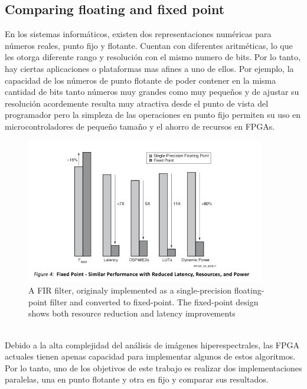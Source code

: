 \subsection{Comparing floating and fixed point}
\label{makereference}

En los sistemas informáticos, existen dos representaciones numéricas para números reales, punto fijo y flotante. Cuentan con diferentes aritméticas, lo que les otorga diferente rango y resolución con el mismo numero de bits. Por lo tanto, hay ciertas aplicaciones o plataformas mas afines a uno de ellos. Por ejemplo, la capacidad de los números de punto flotante de poder contener en la misma cantidad de bits tanto números muy grandes como muy pequeños y de ajustar su resolución acordemente resulta muy atractiva desde el punto de vista del programador pero la simpleza de las operaciones en punto fijo permiten su uso en microcontroladores de pequeño tamaño y el ahorro de recursos en FPGAs.%
\begin{figure}[h!]
\centering
\includegraphics[height=2.5in]{figures/fp_vs_fp.png}
\caption{A FIR filter, originaly implemented as a single-precision floating-point filter and converted to fixed-point. The fixed-point design shows both resource reduction and latency improvements}
  \label{fig:fp}
\end{figure}
\\
Debido a la alta complejidad del análisis de imágenes hiperespectrales, las FPGA actuales tienen apenas capacidad para implementar algunos de estos algoritmos. Por lo tanto, uno de los objetivos de este trabajo es realizar dos implementaciones paralelas, una en punto flotante y otra en fijo y comparar sus resultados.

\pagebreak
